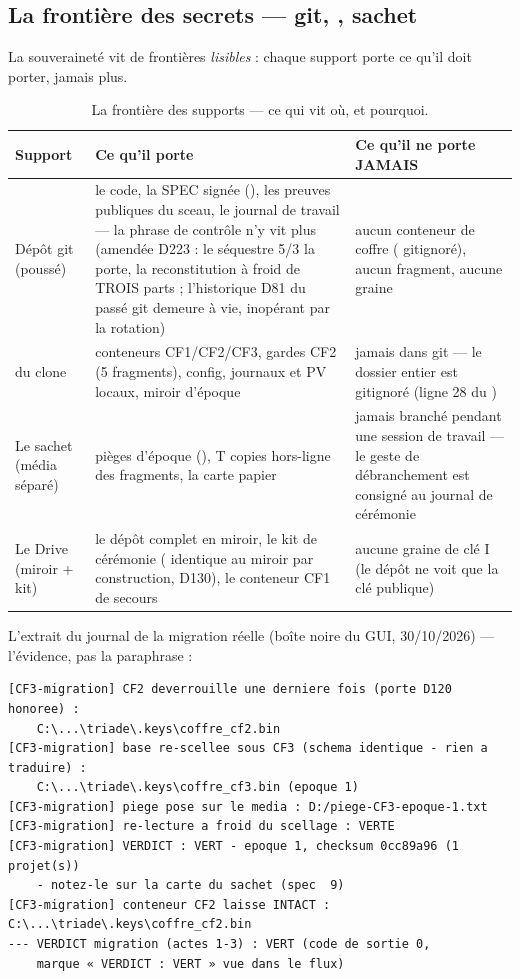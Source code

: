\subsection{La frontière des secrets — git, , sachet}\label{sec:frontiere}

La souveraineté vit de frontières \emph{lisibles} : chaque support porte ce qu'il doit
porter, jamais plus.

\begin{table}[htbp]
\centering\small
\caption{La frontière des supports — ce qui vit où, et pourquoi.}
\label{tab:frontiere}
\begin{tabularx}{\textwidth}{@{}l Y Y@{}}
\toprule
\textbf{Support} & \textbf{Ce qu'il porte} & \textbf{Ce qu'il ne porte JAMAIS} \\
\midrule
Dépôt git (poussé) & le code, la SPEC signée (), les preuves publiques du
sceau, le journal de travail — la phrase de contrôle n'y vit plus (amendée D223 : le
séquestre 5/3 la porte, la reconstitution à froid de TROIS parts ; l'historique
D81 du passé git demeure à vie, inopérant par la rotation) & aucun conteneur de coffre
( gitignoré), aucun fragment, aucune graine \\
 du clone & conteneurs CF1/CF2/CF3, gardes CF2 (5 fragments), config,
journaux et PV locaux, miroir d'époque & jamais dans git — le dossier entier est
gitignoré (ligne 28 du ) \\
Le sachet (média séparé) & pièges d'époque (), T copies
hors-ligne des fragments, la carte papier & jamais branché pendant une session de
travail — le geste de débranchement est consigné au journal de cérémonie \\
Le Drive (miroir + kit) & le dépôt complet en miroir, le kit de cérémonie
( identique au miroir par construction, D130), le conteneur CF1 de secours &
aucune graine de clé I (le dépôt ne voit que la clé publique) \\
\bottomrule
\end{tabularx}
\end{table}

L'extrait du journal de la migration réelle (boîte noire du GUI, 30/10/2026) —
l'évidence, pas la paraphrase :

\begin{lstlisting}
[CF3-migration] CF2 deverrouille une derniere fois (porte D120 honoree) :
    C:\...\triade\.keys\coffre_cf2.bin
[CF3-migration] base re-scellee sous CF3 (schema identique - rien a traduire) :
    C:\...\triade\.keys\coffre_cf3.bin (epoque 1)
[CF3-migration] piege pose sur le media : D:/piege-CF3-epoque-1.txt
[CF3-migration] re-lecture a froid du scellage : VERTE
[CF3-migration] VERDICT : VERT - epoque 1, checksum 0cc89a96 (1 projet(s))
    - notez-le sur la carte du sachet (spec  9)
[CF3-migration] conteneur CF2 laisse INTACT : C:\...\triade\.keys\coffre_cf2.bin
--- VERDICT migration (actes 1-3) : VERT (code de sortie 0,
    marque « VERDICT : VERT » vue dans le flux)
\end{lstlisting}

